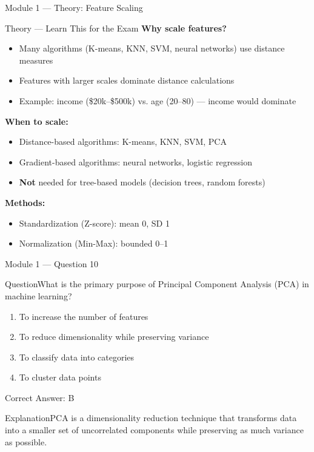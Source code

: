 \documentclass[aspectratio=169,10pt]{beamer}
\newcommand{\question}[1]{\begin{block}{Question}#1\end{block}}
\newcommand{\options}[4]{%
	\begin{enumerate}[label=\Alph*.,leftmargin=*]
		\item #1
		\item #2
		\item #3
		\item #4
	\end{enumerate}
}
\newcommand{\answerbox}[1]{\begin{exampleblock}{Correct Answer: #1}\end{exampleblock}}
\newcommand{\explain}[1]{\begin{block}{Explanation}#1\end{block}}
\newcommand{\theory}[1]{%
	\begin{block}{Theory --- Learn This for the Exam}
		\small #1
	\end{block}
}
\begin{document}
	\begin{frame}{Module 1 --- Theory: Feature Scaling}
		\theory{
			\textbf{Why scale features?}
			\begin{itemize}
				\item Many algorithms (K-means, KNN, SVM, neural networks) use distance measures
				\item Features with larger scales dominate distance calculations
				\item Example: income (\$20k--\$500k) vs. age (20--80) --- income would dominate
			\end{itemize}
			\textbf{When to scale:}
			\begin{itemize}
				\item Distance-based algorithms: K-means, KNN, SVM, PCA
				\item Gradient-based algorithms: neural networks, logistic regression
				\item \textbf{Not} needed for tree-based models (decision trees, random forests)
			\end{itemize}
			\textbf{Methods:}
			\begin{itemize}
				\item Standardization (Z-score): mean 0, SD 1
				\item Normalization (Min-Max): bounded 0--1
			\end{itemize}
		}
	\end{frame}
	
	\begin{frame}{Module 1 --- Question 10}
		\question{What is the primary purpose of Principal Component Analysis (PCA) in machine learning?}
		\options{To increase the number of features}{To reduce dimensionality while preserving variance}{To classify data into categories}{To cluster data points}
		\answerbox{B}
		\explain{PCA is a dimensionality reduction technique that transforms data into a smaller set of uncorrelated components while preserving as much variance as possible.}
	\end{frame}
	
\end{document}

